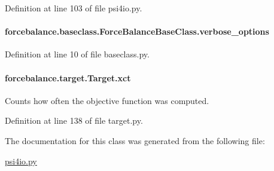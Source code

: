 Definition at line 103 of file psi4io.\-py.

\hypertarget{classforcebalance_1_1baseclass_1_1ForceBalanceBaseClass_a8088e1e20cbd6bc175fb9c9fe9fa0f18}{
\paragraph[{verbose\-\_\-options}]{\setlength{\rightskip}{0pt plus 5cm}forcebalance.\-baseclass.\-Force\-Balance\-Base\-Class.\-verbose\-\_\-options\hspace{0.3cm}{\ttfamily [inherited]}}}\label{classforcebalance_1_1baseclass_1_1ForceBalanceBaseClass_a8088e1e20cbd6bc175fb9c9fe9fa0f18}


Definition at line 10 of file baseclass.\-py.

\hypertarget{classforcebalance_1_1target_1_1Target_aad2e385cfbf7b4a68f1c2cb41133fe82}{
\paragraph[{xct}]{\setlength{\rightskip}{0pt plus 5cm}forcebalance.\-target.\-Target.\-xct\hspace{0.3cm}{\ttfamily [inherited]}}}\label{classforcebalance_1_1target_1_1Target_aad2e385cfbf7b4a68f1c2cb41133fe82}


Counts how often the objective function was computed. 



Definition at line 138 of file target.\-py.



The documentation for this class was generated from the following file\-:\begin{DoxyCompactItemize}
\item 
\hyperlink{psi4io_8py}{psi4io.\-py}\end{DoxyCompactItemize}
